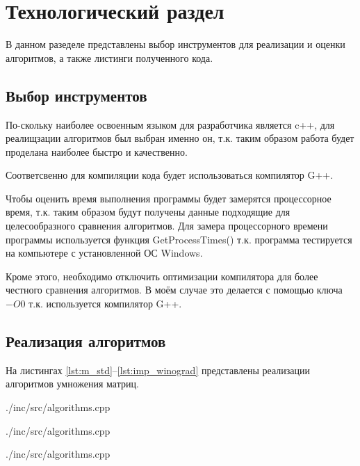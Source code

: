 \chapter{Технологический раздел}
В данном разеделе представлены выбор инструментов для реализации и оценки алгоритмов, а также листинги полученного кода.
\section{Выбор инструментов}
По-скольку наиболее освоенным языком для разработчика является c++, для реалищзации алгоритмов был выбран именно он, т.к. таким образом работа будет проделана наиболее быстро и качественно.

Соответсвенно для компиляции кода будет использоваться компилятор G++.

Чтобы оценить время выполнения программы будет замерятся процессорное время, т.к. таким образом будут получены данные подходящие для целесообразного сравнения алгоритмов. Для замера процессорного времени программы используется функция GetProcessTimes() т.к. программа тестируется на компьютере с установленной ОС Windows. \cite{get_proccess_times}

Кроме этого, необходимо отключить оптимизации компилятора для более честного сравнения алгоритмов. В моём случае это делается с помощью ключа $-O0$ т.к. используется компилятор G++. \cite{optimization}

\section{Реализация алгоритмов}
На листингах \ref{lst:m_std}--\ref{lst:imp_winograd} представлены реализации алгоритмов умножения матриц.

\newpage
\begin{lstinputlisting}[
	caption={Классический алгоритм},
	label={lst:m_std},
	style={c},
	linerange={1-14},
	]{./inc/src/algorithms.cpp}
\end{lstinputlisting}

\begin{lstinputlisting}[
	caption={Алгоритм Винограда},
	label={lst:m_winograd},
	style={c},
	linerange={16-44},
	]{./inc/src/algorithms.cpp}
\end{lstinputlisting}

\newpage
\begin{lstinputlisting}[
	caption={Оптимизированный алгоритм Винограда},
	label={lst:imp_winograd},
	style={c},
	linerange={46-77},
	]{./inc/src/algorithms.cpp}
\end{lstinputlisting}

